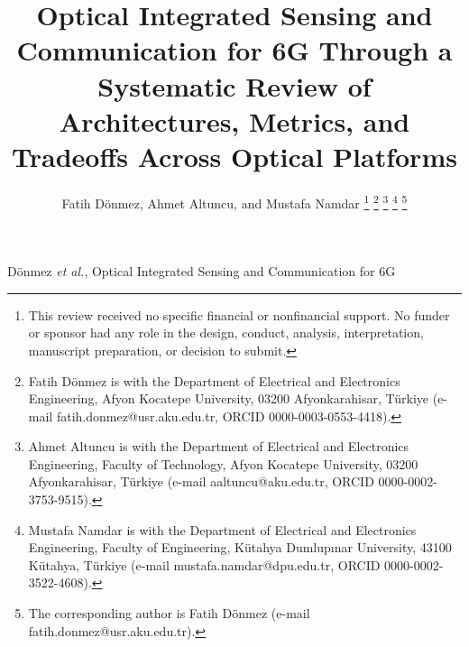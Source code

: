 \documentclass[letterpaper,journal]{IEEEtran}
\begin{document}
\title{Optical Integrated Sensing and Communication for 6G Through a
Systematic Review of Architectures, Metrics, and Tradeoffs Across Optical
Platforms}

\author{Fatih D\"onmez, Ahmet Altuncu, and Mustafa Namdar%
\thanks{This review received no specific financial or nonfinancial support.
No funder or sponsor had any role in the design, conduct, analysis,
interpretation, manuscript preparation, or decision to submit.}%
\thanks{Fatih D\"onmez is with the Department of Electrical and Electronics
Engineering, Afyon Kocatepe University, 03200 Afyonkarahisar, T\"urkiye
(e-mail fatih.donmez@usr.aku.edu.tr, ORCID 0000-0003-0553-4418).}%
\thanks{Ahmet Altuncu is with the Department of Electrical and Electronics
Engineering, Faculty of Technology, Afyon Kocatepe University, 03200
Afyonkarahisar, T\"urkiye (e-mail aaltuncu@aku.edu.tr, ORCID
0000-0002-3753-9515).}%
\thanks{Mustafa Namdar is with the Department of Electrical and Electronics
Engineering, Faculty of Engineering, K\"utahya Dumlup{\i}nar University,
43100 K\"utahya, T\"urkiye (e-mail mustafa.namdar@dpu.edu.tr, ORCID
0000-0002-3522-4608).}%
\thanks{The corresponding author is Fatih D\"onmez
(e-mail fatih.donmez@usr.aku.edu.tr).}}

%
{D\"onmez \MakeLowercase{\textit{et al.}}, Optical Integrated Sensing and
Communication for 6G}

\maketitle
{}





\end{document}
